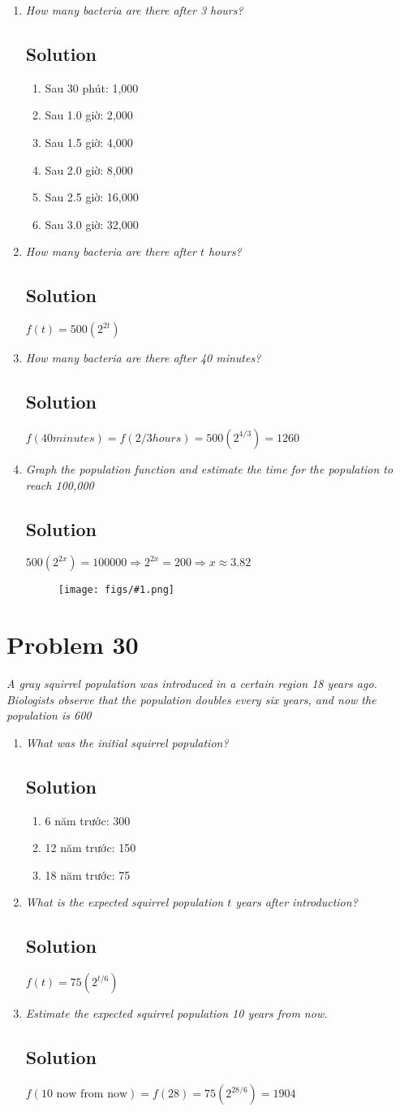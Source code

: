 \documentclass[11pt]{article}
\newcommand{\soln}{\subsection*}
\newcommand{\qn}{\textit}
\newcommand{\imgsoln}[1]{
	\begin{figure}[H]
		\centering
		\texttt{[image: figs/\#1.png]}
	\end{figure}
}
\begin{document}
\begin{enumerate}
	\item \qn{How many bacteria are there after 3 hours?}
	\soln{Solution}
	\begin{enumerate}
		\item Sau 30 phút: 1,000
		\item Sau 1.0 giờ: 2,000
		\item Sau 1.5 giờ: 4,000
		\item Sau 2.0 giờ: 8,000
		\item Sau 2.5 giờ: 16,000
		\item Sau 3.0 giờ: 32,000
	\end{enumerate}
	
	\item \qn{How many bacteria are there after $t$ hours?}
	\soln{Solution}
	$f(t)=500(2^{2t})$
	
	\item \qn{How many bacteria are there after 40 minutes?}
	\soln{Solution}
	$f(40 minutes)=f(2/3 hours)=500(2^{4/3})=1260$
	
	\item \qn{Graph the population function and estimate the time for the population to reach 100,000}
	\soln{Solution}
	$500(2^{2x})=100000 \Rightarrow 2^{2x}=200 \Rightarrow x \approx 3.82$
	\imgsoln{1.4.29-ans.c}
\end{enumerate}

\section*{Problem 30}

\qn{A gray squirrel population was introduced in a certain region 18 years ago. Biologists observe that the population doubles every six years, and now the population is 600}

\begin{enumerate}
	\item \qn{What was the initial squirrel population?}
	\soln{Solution}
	\begin{enumerate}
		\item 6 năm trước: 300
		\item 12 năm trước: 150
		\item 18 năm trước: 75
	\end{enumerate}
	
	\item \qn{What is the expected squirrel population $t$ years after introduction?}
	\soln{Solution}
	$f(t)=75(2^{t/6})$
	
	\item \qn{Estimate the expected squirrel population 10 years from now.}
	\soln{Solution}
	$f(\text{10 now from now})=f(28)=75(2^{28/6})=1904$
\end{enumerate}
\end{document}
